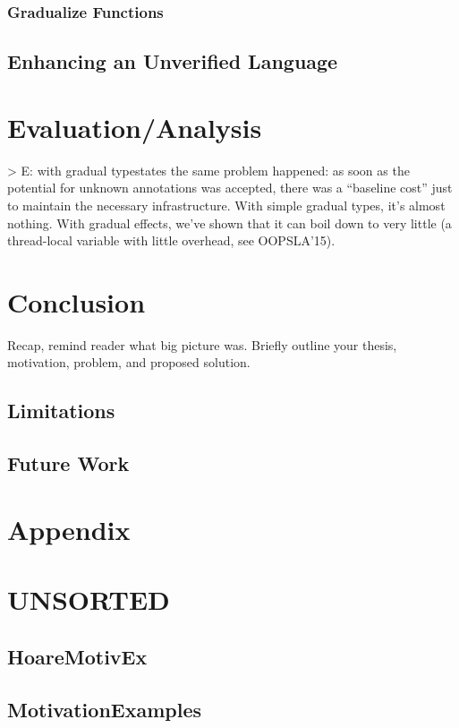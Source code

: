 \subsection{Gradualize Functions}

\section{Enhancing an Unverified Language}


\chapter{Evaluation/Analysis}
> E:
with gradual typestates the same problem happened: as soon as the potential for unknown annotations was accepted, there was a “baseline cost” just to maintain the necessary infrastructure.
With simple gradual types, it’s almost nothing. With gradual effects, we’ve shown that it can boil down to very little (a thread-local variable with little overhead, see OOPSLA’15). 



\chapter{Conclusion}
Recap, remind reader what big picture was.
Briefly outline your thesis, motivation, problem, and proposed solution.

\section{Limitations}

\section{Future Work}


\chapter{Appendix}


\chapter{UNSORTED}

\section{HoareMotivEx}
\label{sec:hoaremotivex}


\section{MotivationExamples}
\label{sec:motivationexamples}

